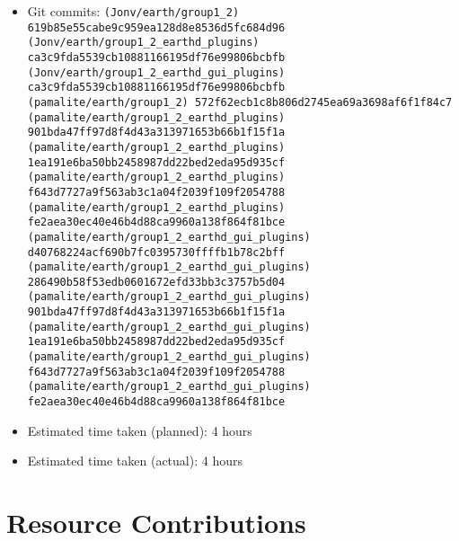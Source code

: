 \begin{itemize}
\begin{itemize}
            \item Git commits: \texttt{(Jonv/earth/group1\_2) 619b85e55cabe9c959ea128d8e8536d5fc684d96} \\
                \texttt{(Jonv/earth/group1\_2\_earthd\_plugins) ca3c9fda5539cb10881166195df76e99806bcbfb} \\
                \texttt{(Jonv/earth/group1\_2\_earthd\_gui\_plugins) ca3c9fda5539cb10881166195df76e99806bcbfb} \\
                \texttt{(pamalite/earth/group1\_2)  572f62ecb1c8b806d2745ea69a3698af6f1f84c7} \\
                \texttt{(pamalite/earth/group1\_2\_earthd\_plugins) 901bda47ff97d8f4d43a313971653b66b1f15f1a} \\
                \texttt{(pamalite/earth/group1\_2\_earthd\_plugins) 1ea191e6ba50bb2458987dd22bed2eda95d935cf} \\
                \texttt{(pamalite/earth/group1\_2\_earthd\_plugins) f643d7727a9f563ab3c1a04f2039f109f2054788} \\
                \texttt{(pamalite/earth/group1\_2\_earthd\_plugins) fe2aea30ec40e46b4d88ca9960a138f864f81bce} \\
                \texttt{(pamalite/earth/group1\_2\_earthd\_gui\_plugins) d40768224acf690b7fc0395730ffffb1b78c2bff} \\
                \texttt{(pamalite/earth/group1\_2\_earthd\_gui\_plugins) 286490b58f53edb0601672efd33bb3c3757b5d04} \\
                \texttt{(pamalite/earth/group1\_2\_earthd\_gui\_plugins) 901bda47ff97d8f4d43a313971653b66b1f15f1a} \\
                \texttt{(pamalite/earth/group1\_2\_earthd\_gui\_plugins) 1ea191e6ba50bb2458987dd22bed2eda95d935cf} \\
                \texttt{(pamalite/earth/group1\_2\_earthd\_gui\_plugins) f643d7727a9f563ab3c1a04f2039f109f2054788} \\
                \texttt{(pamalite/earth/group1\_2\_earthd\_gui\_plugins) fe2aea30ec40e46b4d88ca9960a138f864f81bce}
            \item Estimated time taken (planned): 4 hours
            \item Estimated time taken (actual): 4 hours
        \end{itemize}
\end{itemize}

\section*{Resource Contributions}

